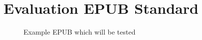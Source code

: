 \chapter{Evaluation EPUB Standard}
\label{ch:Evaluation EPUB Standard}

\begin{figure}[h]

	\begin{minipage}{0.5\textwidth}
		\centering
	\end{minipage}\hfill
	\begin{minipage}{0.5\textwidth}
		\centering
	\end{minipage}

	\caption{Example EPUB which will be tested}
	\label{fig:exampleEPUB}
\end{figure}

